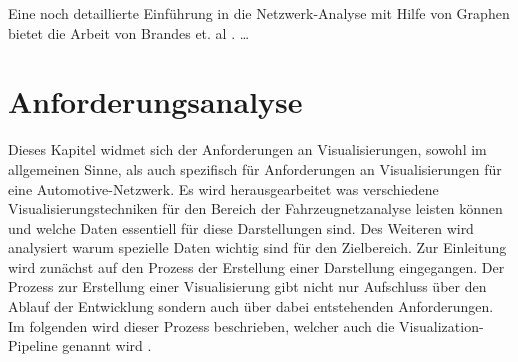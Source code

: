 \documentclass[draft=false
              ,paper=a4
              ,twoside=false
              ,fontsize=11pt
              ,headsepline
              ,BCOR10mm
              ,DIV11
              ]{scrbook}
\newcommand{\TODO}[1]{\colorbox{yellow}{\textcolor{red}{[TODO: #1]}}}
\begin{document}
Eine noch detaillierte Einführung in die Netzwerk-Analyse mit Hilfe von Graphen bietet die Arbeit von Brandes et. al \cite{brandes2005network}. %
\ldots
 %

\chapter{Anforderungsanalyse} %
\label{cha:anforderungsanalyse}
Dieses Kapitel widmet sich der Anforderungen an Visualisierungen, sowohl im allgemeinen Sinne, als auch spezifisch für Anforderungen an Visualisierungen für eine Automotive-Netzwerk. Es wird herausgearbeitet was verschiedene Visualisierungstechniken für den Bereich der Fahrzeugnetzanalyse leisten können und welche Daten essentiell für diese Darstellungen sind. Des Weiteren wird analysiert warum spezielle Daten wichtig sind für den Zielbereich. Zur Einleitung wird zunächst auf den Prozess der Erstellung einer Darstellung eingegangen. Der Prozess zur Erstellung einer Visualisierung gibt nicht nur Aufschluss über den Ablauf der Entwicklung sondern auch über dabei entstehenden Anforderungen. Im folgenden wird dieser Prozess beschrieben, welcher auch die Visualization-Pipeline genannt wird \cite{ward_interactive_2010}. 
\end{document}
